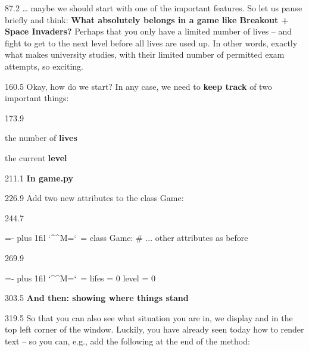 \documentclass{aslab}
\makeatletter
\newcommand*\kw[1]{\textcolor{codeorange}{#1}}
\newcommand*\fn[1]{\textcolor{codecyan}{#1}}
\newcommand*\num[1]{\textcolor{codered}{#1}}
\newcommand*\cmt[1]{\textcolor{codepurple}{#1}}
\newenvironment{pycode}{\par\ttfamily\hyphenchar\font=-1
  \lineskiplimit=-\maxdimen\lineskip=0pt\parindent=0pt
  \parfillskip=0pt plus 1fil\relax
  \catcode`\^^M=\active\catcode`\ =\active\py@setup\py@gobble}{}
\newcommand*\emo[1]{\makebox[18bp][l]{\emoji{#1}}}
\makeatother
\begin{document}
\begin{region}[pitch=13.7]{87.2}
\dots{} maybe we should start with one of the important features. So let us
pause briefly and think: \textbf{What absolutely belongs in a game like
Breakout + Space Invaders?} Perhaps that you only have a limited number of
lives -- and fight to get to the next level before all lives are used up. In
other words, exactly what makes university studies, with their limited number
of permitted exam attempts, so exciting.
\end{region}

\begin{region}{160.5}
Okay, how do we start? In any case, we need to \textbf{keep track} of two
important things:
\end{region}

\begin{region}[pitch=14.2]{173.9}
\begin{dashlist}
\item the number of \textbf{lives}
\item the current \textbf{level}
\end{dashlist}
\end{region}

\begin{region}{211.1}
\emo{1F9F1}\textbf{In game.py}
\end{region}

\begin{region}{226.9}
Add two new attributes to the class Game:
\end{region}

\begin{region}[pitch=13.2]{244.7}
\begin{pycode}
\kw{class} \fn{Game}:
    \cmt{\# ... other attributes as before}
\end{pycode}
\end{region}
\begin{region}[]{269.9}
\begin{pycode}
    lifes = \num{0}
    level = \num{0}
\end{pycode}
\end{region}

\begin{region}{303.5}
\emo{1F5BC}\textbf{And then: showing where things stand}
\end{region}

\begin{region}[pitch=13.35]{319.5}
So that you can also see what situation you are in, we display 
and  in the top left corner of the window. Luckily, you have
already seen today how to render text -- so you can, e.g., add the following
at the end of the  method:
\end{region}
\end{document}
